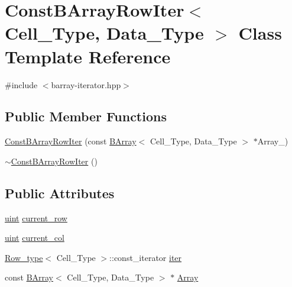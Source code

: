 \hypertarget{class_const_b_array_row_iter}{}\section{Const\+B\+Array\+Row\+Iter$<$ Cell\+\_\+\+Type, Data\+\_\+\+Type $>$ Class Template Reference}
\label{class_const_b_array_row_iter}


{\ttfamily \#include $<$barray-\/iterator.\+hpp$>$}

\subsection*{Public Member Functions}
\begin{DoxyCompactItemize}
\item 
\hyperlink{class_const_b_array_row_iter_aa7eb0016052539d179dfe3fc82732f2e}{Const\+B\+Array\+Row\+Iter} (const \hyperlink{class_b_array}{B\+Array}$<$ Cell\+\_\+\+Type, Data\+\_\+\+Type $>$ $\ast$Array\+\_\+)
\item 
\hyperlink{class_const_b_array_row_iter_a5f32704679331be41e994d37294e3476}{$\sim$\+Const\+B\+Array\+Row\+Iter} ()
\end{DoxyCompactItemize}
\subsection*{Public Attributes}
\begin{DoxyCompactItemize}
\item 
\hyperlink{typedefs_8hpp_a91ad9478d81a7aaf2593e8d9c3d06a14}{uint} \hyperlink{class_const_b_array_row_iter_a6e12a5d0e899823179dd469d11f57b1a}{current\+\_\+row}
\item 
\hyperlink{typedefs_8hpp_a91ad9478d81a7aaf2593e8d9c3d06a14}{uint} \hyperlink{class_const_b_array_row_iter_a1cc52bf86768fc2438f1f13df70d3679}{current\+\_\+col}
\item 
\hyperlink{typedefs_8hpp_a4deca4f3fb25a4da374818ab459b8b4a}{Row\+\_\+type}$<$ Cell\+\_\+\+Type $>$\+::const\+\_\+iterator \hyperlink{class_const_b_array_row_iter_ac01a8c0291ccc243bd4363bcbc5122a8}{iter}
\item 
const \hyperlink{class_b_array}{B\+Array}$<$ Cell\+\_\+\+Type, Data\+\_\+\+Type $>$ $\ast$ \hyperlink{class_const_b_array_row_iter_ae7f5ef61225621953a664e73c6153ed3}{Array}
\end{DoxyCompactItemize}


